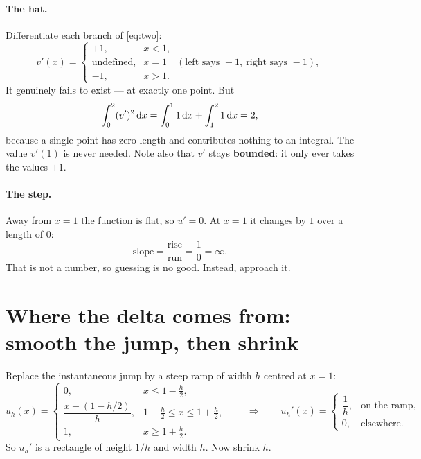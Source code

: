 \documentclass[11pt]{article}
\begin{document}
\paragraph{The hat.} Differentiate each branch of \eqref{eq:two}:
\begin{equation}
  v'(x) = \begin{cases}
    +1, & x<1,\\
    \text{undefined}, & x=1 \quad(\text{left says }+1,\ \text{right says }-1),\\
    -1, & x>1 .
  \end{cases}
\end{equation}
It genuinely fails to exist --- at exactly one point. But
\begin{equation}
  \int_{0}^{2}(v')^{2}\,\mathrm{d} x = \int_{0}^{1}1\,\mathrm{d} x + \int_{1}^{2}1\,\mathrm{d} x = 2,
\end{equation}
because a single point has zero length and contributes nothing to an integral.
The value $v'(1)$ is never needed. Note also that $v'$ stays \textbf{bounded}:
it only ever takes the values $\pm1$.

\paragraph{The step.} Away from $x=1$ the function is flat, so $u'=0$. At
$x=1$ it changes by $1$ over a length of $0$:
\[
  \text{slope} = \frac{\text{rise}}{\text{run}} = \frac{1}{0} = \infty .
\]
That is not a number, so guessing is no good. Instead, approach it.

\section{Where the delta comes from: smooth the jump, then shrink}
\label{sec:smoothing}

Replace the instantaneous jump by a steep ramp of width $h$ centred at $x=1$:
\begin{equation}\label{eq:uh}
  u_{h}(x) = \begin{cases}
    0, & x \le 1-\tfrac{h}{2},\\[2pt]
    \dfrac{x-(1-h/2)}{h}, & 1-\tfrac{h}{2}\le x\le 1+\tfrac{h}{2},\\[6pt]
    1, & x \ge 1+\tfrac{h}{2}.
  \end{cases}
  \qquad\Longrightarrow\qquad
  u_{h}'(x) = \begin{cases}
    \dfrac{1}{h}, & \text{on the ramp,}\\[6pt]
    0, & \text{elsewhere.}
  \end{cases}
\end{equation}
So $u_{h}'$ is a rectangle of height $1/h$ and width $h$. Now shrink $h$.
\end{document}
